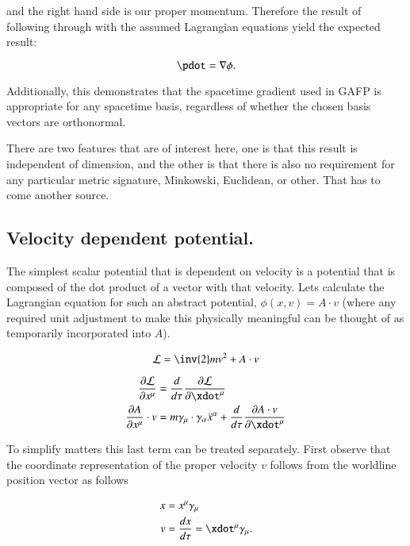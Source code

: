 and the right hand side is our proper momentum.  Therefore the result of following through with the assumed Lagrangian equations yield the expected result:

\begin{equation}
\pdot = \grad \phi.
\end{equation}

Additionally, this demonstrates that the spacetime gradient used in GAFP is appropriate for any spacetime basis, regardless of whether the chosen basis vectors are orthonormal.

There are two features that are of interest here, one is that this result is independent of dimension, and the other is that there is also no requirement for any particular metric signature, Minkowski, Euclidean, or other.  That has to come another source.

\subsection{Velocity dependent potential. }

The simplest scalar potential that is dependent on velocity is a potential that is composed of the dot product of a vector with that velocity.  Lets calculate the Lagrangian
equation for such an abstract potential, $\phi(x,v) = A \cdot v$ (where any required unit adjustment to make this physically meaningful can be thought of as temporarily incorporated into $A$).

\begin{equation}
\mathcal{L} = \inv{2}m v^2 + A \cdot v
\end{equation}

\begin{align*}
\frac{\partial \mathcal{L}}{\partial x^{\mu}} &= \frac{d}{d\tau} \frac{\partial \mathcal{L}}{\partial \xdot^{\mu}} \\
\frac{\partial A}{\partial x^{\mu}} \cdot v &= m \gamma_{\mu} \cdot \gamma_{\alpha} \ddot{x}^{\alpha} +\frac{d}{d\tau} \frac{\partial A \cdot v}{\partial \xdot^{\mu}} \\
\end{align*}

To simplify matters this last term can be treated separately.  First observe that the coordinate representation of the proper velocity $v$ follows from the worldline
position vector as follows

\begin{align*}
x &= x^\mu \gamma_\mu \\
v &= \frac{dx}{d\tau} = \xdot^\mu \gamma_\mu.
\end{align*}


